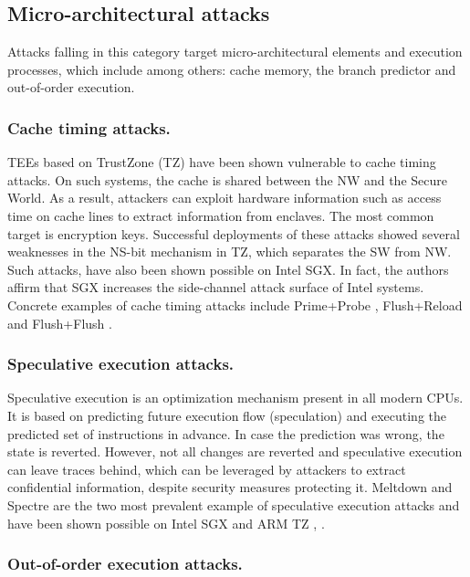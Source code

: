 \documentclass[runningheads,a4paper]{uwsese}
\begin{document}
\subsection{Micro-architectural attacks}

Attacks falling in this category target micro-architectural elements and
execution processes, which include among others: cache memory, the branch
predictor and out-of-order execution.

\subsubsection{Cache timing attacks.}
\label{cache_attacks}

TEEs based on TrustZone (TZ) have been shown vulnerable to cache timing
attacks. On such systems, the cache is shared between the NW and the Secure
World. As a result, attackers can exploit hardware information such as access
time on cache lines to extract information from enclaves. The most common
target is encryption keys. Successful deployments of these attacks showed
several weaknesses in the NS-bit mechanism in TZ, which separates the SW from
NW. Such attacks, have also been shown possible on Intel SGX. In fact, the
authors affirm that SGX increases the side-channel attack surface
\cite{cache_sgx} of Intel systems. Concrete examples of cache timing attacks
include Prime+Probe \cite{prime_probe}, Flush+Reload \cite{flush_reload} and
Flush+Flush \cite{flush_flush}.

\subsubsection{Speculative execution attacks.}

Speculative execution is an optimization mechanism present in all modern CPUs.
It is based on predicting future execution flow (speculation) and executing the
predicted set of instructions in advance. In case the prediction was wrong, the
state is reverted. However, not all changes are reverted and speculative
execution can leave traces behind, which can be leveraged by attackers to
extract confidential information, despite security measures protecting it.
Meltdown and Spectre are the two most prevalent example of speculative
execution attacks and have been shown possible on Intel SGX and ARM TZ
\cite{brasser}, \cite{sgxpectre}.

\subsubsection{Out-of-order execution attacks.}
\end{document}
